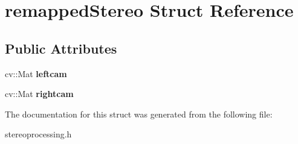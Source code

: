 \hypertarget{structremapped_stereo}{}\section{remapped\+Stereo Struct Reference}
\label{structremapped_stereo}
\subsection*{Public Attributes}
\begin{DoxyCompactItemize}
\item 
\mbox{\label{structremapped_stereo_a11d5e5b317e723eb3e436b9efc0f5e38}} 
cv\+::\+Mat {\bfseries leftcam}
\item 
\mbox{\label{structremapped_stereo_a7048a160901fac65ac051abbd28e9cfb}} 
cv\+::\+Mat {\bfseries rightcam}
\end{DoxyCompactItemize}


The documentation for this struct was generated from the following file\+:\begin{DoxyCompactItemize}
\item 
stereoprocessing.\+h\end{DoxyCompactItemize}
